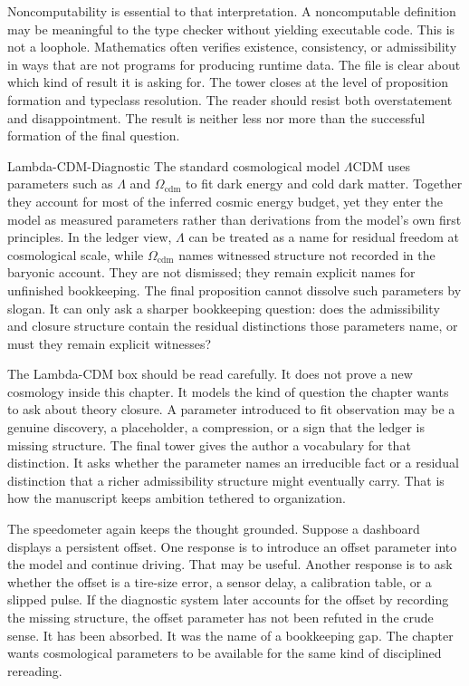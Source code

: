 Noncomputability is essential to that interpretation. A noncomputable
definition may be meaningful to the type checker without yielding executable
code. This is not a loophole. Mathematics often verifies existence,
consistency, or admissibility in ways that are not programs for producing
runtime data. The file is clear about which kind of result it is asking for.
The tower closes at the level of proposition formation and typeclass
resolution. The reader should resist both overstatement and disappointment.
The result is neither less nor more than the successful formation of the final
question.

\begin{gphenom}{Lambda-CDM-Diagnostic}
\label{ph:lambda-cdm}
\GPhObs The standard cosmological model $\Lambda$CDM uses parameters such as
$\Lambda$ and $\Omega_{\text{cdm}}$ to fit dark energy and cold dark matter.
Together they account for most of the inferred cosmic energy budget, yet they
enter the model as measured parameters rather than derivations from the model's
own first principles.
\GPhCon In the ledger view, $\Lambda$ can be treated as a name for residual
freedom at cosmological scale, while $\Omega_{\text{cdm}}$ names witnessed
structure not recorded in the baryonic account. They are not dismissed; they
remain explicit names for unfinished bookkeeping.
\GPhSeq The final proposition cannot dissolve such parameters by slogan. It can
only ask a sharper bookkeeping question: does the admissibility and closure
structure contain the residual distinctions those parameters name, or must they
remain explicit witnesses?
\end{gphenom}

The Lambda-CDM box should be read carefully. It does not prove a new cosmology
inside this chapter. It models the kind of question the chapter wants to ask
about theory closure. A parameter introduced to fit observation may be a
genuine discovery, a placeholder, a compression, or a sign that the ledger is
missing structure. The final tower gives the author a vocabulary for that
distinction. It asks whether the parameter names an irreducible fact or a
residual distinction that a richer admissibility structure might eventually
carry. That is how the manuscript keeps ambition tethered to organization.

The speedometer again keeps the thought grounded. Suppose a dashboard displays
a persistent offset. One response is to introduce an offset parameter into
the model and continue driving. That may be useful. Another response is to ask
whether the offset is a tire-size error, a sensor delay, a calibration table,
or a slipped pulse. If the diagnostic system later accounts for the offset by
recording the missing structure, the offset parameter has not been refuted in
the crude sense. It has been absorbed. It was the name of a bookkeeping gap.
The chapter wants cosmological parameters to be available for the same kind
of disciplined rereading.

